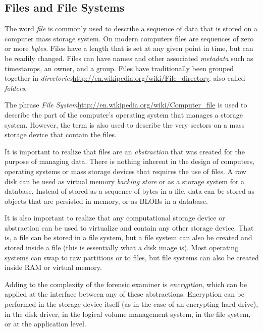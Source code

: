 \subsection{Files and File Systems}
The word \emph{file} is commonly used to describe a sequence of data
that is stored on a computer mass storage system. On modern computers
files are sequences of zero or more \emph{bytes}. Files have a length
that is set at any given point in time, but can be readily
changed. Files can have names and other associated \emph{metadata}
such as timestamps, an owner, and a group. Files have traditionally
been grouped together in
\emph{directories}\url{http://en.wikipedia.org/wiki/File_directory}. also
called \emph{folders}. 

The phrase \emph{File
  System}\url{http://en.wikipedia.org/wiki/Computer_file} is
used to describe the part of the computer's operating
system that manages a storage system. However, the term is also used
to describe the very sectors on a mass storage device that contain the
files.

It is important to realize that files are an \emph{abstraction} that
was created for the purpose of managing data. There is nothing
inherent in the design of computers, operating systems or mass storage
devices that requires the use of files. A raw disk can be used as
virtual memory \emph{backing store} or as a storage system for a
database. Instead of stored as a sequence of bytes in a file, data can be stored as
objects that are persisted in memory, or as BLOBs in a database.

It is also important to realize that any computational storage device
or abstraction can be used to virtualize and contain any other storage
device. That is, a file can be stored in a file system, but a file
system can also be created and stored inside a file (this is
essentially what a disk image is). Most operating systems can swap to raw
partitions or to files, but file systems can also be created inside
RAM or virtual memory.

Adding to the complexity of the forensic examiner is
\emph{encryption}, which can be applied at the interface between any
of these abstractions. Encryption can be performed in the storage
device itself (as in the case of an encrypting hard drive), in the
disk driver, in the logical volume management system, in the file
system, or at the application level.

